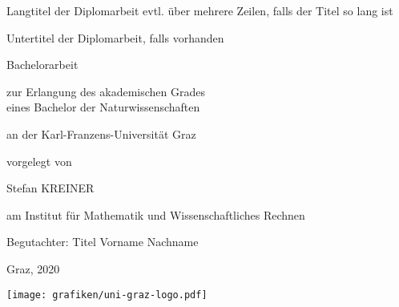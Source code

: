 



\thispagestyle{empty}


\begin{center}

\vspace*{0.5cm}

\begin{huge}
\color{blau1}

Langtitel der Diplomarbeit evtl. über mehrere Zeilen, falls der Titel so lang ist


\end{huge}

\vspace*{3mm}

\Large{Untertitel der Diplomarbeit, falls vorhanden}

\vspace*{1.5cm}

\huge{Bachelorarbeit}

\vspace*{1cm}

\large

zur Erlangung des akademischen Grades \\
eines Bachelor der Naturwissenschaften

\vspace*{5mm}

an der Karl-Franzens-Universität Graz

\vspace*{2.5cm}


vorgelegt von


\Large{Stefan KREINER}

\vspace*{1cm}

am Institut für Mathematik und Wissenschaftliches Rechnen

Begutachter: Titel Vorname Nachname

\vspace*{1.5cm}

Graz, 2020

\texttt{[image: grafiken/uni-graz-logo.pdf]} 

\end{center}

\clearpage